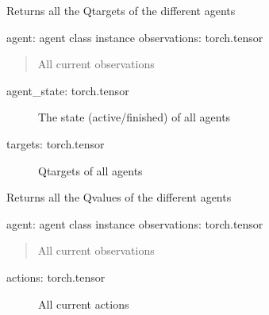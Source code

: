 \documentclass[letterpaper,10pt,english]{sphinxmanual}
\begin{document}
\begin{fulllineitems}

\begin{fulllineitems}
\label{\detokenize{MultiAgentMarketRL:trainer.DeepQTrainer.get_agent_Q_target}}
\sphinxAtStartPar
Returns all the Q\sphinxhyphen{}targets of the different agents

\sphinxAtStartPar
agent: agent class instance
observations: torch.tensor
\begin{quote}

\sphinxAtStartPar
All current observations
\end{quote}
\begin{description}
\item[{agent\_state: torch.tensor}] \leavevmode
\sphinxAtStartPar
The state (active/finished) of all agents

\end{description}
\begin{description}
\item[{targets: torch.tensor}] \leavevmode
\sphinxAtStartPar
Q\sphinxhyphen{}targets of all agents

\end{description}

\end{fulllineitems}


\begin{fulllineitems}
\label{\detokenize{MultiAgentMarketRL:trainer.DeepQTrainer.get_agent_Q_values}}
\sphinxAtStartPar
Returns all the Q\sphinxhyphen{}values of the different agents

\sphinxAtStartPar
agent: agent class instance
observations: torch.tensor
\begin{quote}

\sphinxAtStartPar
All current observations
\end{quote}
\begin{description}
\item[{actions: torch.tensor}] \leavevmode
\sphinxAtStartPar
All current actions


\end{description}
\end{fulllineitems}
\end{fulllineitems}
\end{document}
